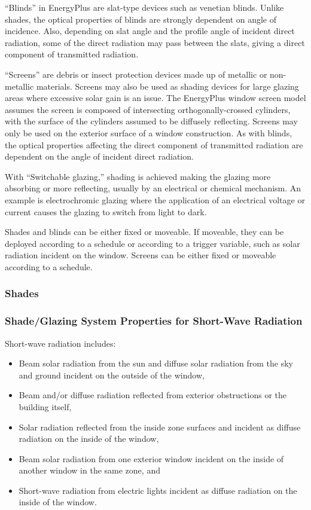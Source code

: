 ``Blinds'' in EnergyPlus are slat-type devices such as venetian blinds. Unlike shades, the optical properties of blinds are strongly dependent on angle of incidence. Also, depending on slat angle and the profile angle of incident direct radiation, some of the direct radiation may pass between the slats, giving a direct component of transmitted radiation.

``Screens'' are debris or insect protection devices made up of metallic or non-metallic materials. Screens may also be used as shading devices for large glazing areas where excessive solar gain is an issue. The EnergyPlus window screen model assumes the screen is composed of intersecting orthogonally-crossed cylinders, with the surface of the cylinders assumed to be diffusely reflecting. Screens may only be used on the exterior surface of a window construction. As with blinds, the optical properties affecting the direct component of transmitted radiation are dependent on the angle of incident direct radiation.

With ``Switchable glazing,'' shading is achieved making the glazing more absorbing or more reflecting, usually by an electrical or chemical mechanism. An example is electrochromic glazing where the application of an electrical voltage or current causes the glazing to switch from light to dark.

Shades and blinds can be either fixed or moveable. If moveable, they can be deployed according to a schedule or according to a trigger variable, such as solar radiation incident on the window. Screens can be either fixed or moveable according to a schedule.

\subsubsection{Shades}\label{shades}

\subsubsection{Shade/Glazing System Properties for Short-Wave Radiation}\label{shadeglazing-system-properties-for-short-wave-radiation}

Short-wave radiation includes:

\begin{itemize}
\item Beam solar radiation from the sun and diffuse solar radiation from the sky and ground incident on the outside of the window,
\item Beam and/or diffuse radiation reflected from exterior obstructions or the building itself,
\item Solar radiation reflected from the inside zone surfaces and incident as diffuse radiation on the inside of the window,
\item Beam solar radiation from one exterior window incident on the inside of another window in the same zone, and
\item Short-wave radiation from electric lights incident as diffuse radiation on the inside of the window.
\end{itemize}

